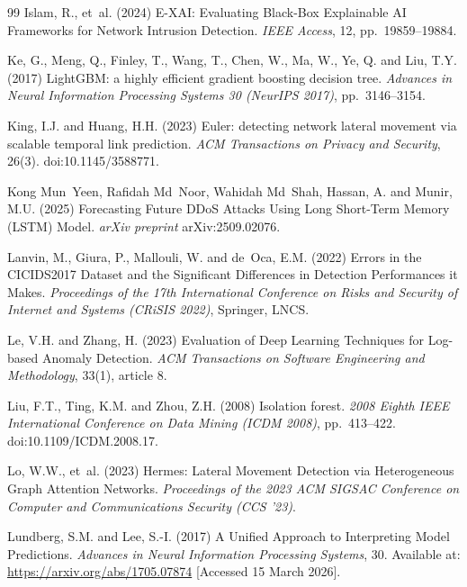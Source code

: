 \documentclass[12pt,a4paper]{report}
\begin{document}
\begin{thebibliography}{99}
Islam, R., et~al. (2024) E-XAI: Evaluating Black-Box Explainable AI Frameworks for Network Intrusion Detection. \textit{IEEE Access}, 12, pp.~19859--19884.

Ke, G., Meng, Q., Finley, T., Wang, T., Chen, W., Ma, W., Ye, Q. and Liu, T.Y. (2017) LightGBM: a highly efficient gradient boosting decision tree. \textit{Advances in Neural Information Processing Systems 30 (NeurIPS 2017)}, pp.~3146--3154.

King, I.J. and Huang, H.H. (2023) Euler: detecting network lateral movement via scalable temporal link prediction. \textit{ACM Transactions on Privacy and Security}, 26(3). doi:10.1145/3588771.

Kong Mun~Yeen, Rafidah Md~Noor, Wahidah Md~Shah, Hassan, A. and Munir, M.U. (2025) Forecasting Future DDoS Attacks Using Long Short-Term Memory (LSTM) Model. \textit{arXiv preprint} arXiv:2509.02076.

Lanvin, M., Giura, P., Mallouli, W. and de~Oca, E.M. (2022) Errors in the CICIDS2017 Dataset and the Significant Differences in Detection Performances it Makes. \textit{Proceedings of the 17th International Conference on Risks and Security of Internet and Systems (CRiSIS 2022)}, Springer, LNCS.

Le, V.H. and Zhang, H. (2023) Evaluation of Deep Learning Techniques for Log-based Anomaly Detection. \textit{ACM Transactions on Software Engineering and Methodology}, 33(1), article 8.

Liu, F.T., Ting, K.M. and Zhou, Z.H. (2008) Isolation forest. \textit{2008 Eighth IEEE International Conference on Data Mining (ICDM 2008)}, pp.~413--422. doi:10.1109/ICDM.2008.17.

Lo, W.W., et~al. (2023) Hermes: Lateral Movement Detection via Heterogeneous Graph Attention Networks. \textit{Proceedings of the 2023 ACM SIGSAC Conference on Computer and Communications Security (CCS '23)}.

Lundberg, S.M. and Lee, S.-I. (2017) A Unified Approach to Interpreting Model Predictions. \textit{Advances in Neural Information Processing Systems}, 30. Available at: \url{https://arxiv.org/abs/1705.07874} [Accessed 15 March 2026].


\end{thebibliography}
\end{document}
